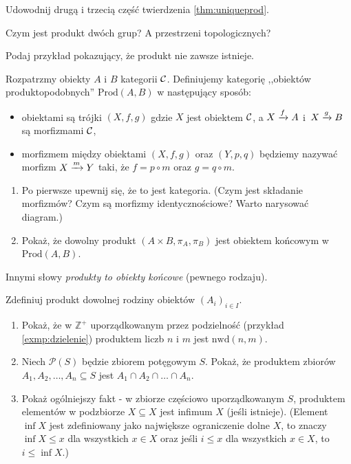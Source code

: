 \begin{exc}
  Udowodnij drugą i trzecią część twierdzenia \ref{thm:uniqueprod}.
\end{exc}

\begin{exc}
  Czym jest produkt dwóch grup? A przestrzeni topologicznych?
\end{exc}

\begin{exc}
  Podaj przykład pokazujący, że produkt nie zawsze istnieje.
\end{exc}

\begin{exc}
  \label{exc:produkt_poczatkowy}
  {
  \newcommand{\Prod}{\text{Prod}(A, B)}
  Rozpatrzmy obiekty $A$ i $B$ kategorii $\C$. Definiujemy kategorię ,,obiektów produktopodobnych'' $\Prod$ w następujący sposób:
  \begin{itemize}
    \item obiektami są trójki $(X, f, g)$ gdzie $X$ jest obiektem $\C$, a $\morpharr fXA$ i~$\morpharr gXB$ są morfizmami $\C$,
    \item morfizmem między obiektami $(X, f, g)$ oraz $(Y, p, q)$ będziemy nazywać morfizm $\morpharr mXY$ taki, że $f=p\circ m$ oraz $g=q\circ m$.
  \end{itemize}

  \begin{enumerate}
    \item Po pierwsze upewnij się, że to jest kategoria. (Czym jest składanie morfizmów? Czym są morfizmy identycznościowe? Warto narysować diagram.)
    \item Pokaż, że dowolny produkt $(A\times B, \pi_A, \pi_B)$ jest obiektem końcowym w $\Prod$.
  \end{enumerate}
  Innymi słowy \emph{produkty to obiekty końcowe} (pewnego rodzaju).
  }
\end{exc}

\begin{exc}
  Zdefiniuj produkt dowolnej rodziny obiektów $(A_i)_{i\in I}$.
\end{exc}

\begin{exc}
  \begin{enumerate}
    \item Pokaż, że w $\mathbb Z^+$ uporządkowanym przez podzielność (przykład \ref{exmp:dzielenie}) produktem liczb $n$ i $m$ jest $\mathrm{nwd}(n, m)$.
    \item Niech $\mathcal P(S)$ będzie zbiorem potęgowym $S$. Pokaż, że produktem zbiorów $A_1, A_2, \dots, A_n\subseteq S$ jest $A_1\cap A_2\cap \dots \cap A_n$.
    \item Pokaż ogólniejszy fakt - w zbiorze częściowo uporządkowanym $S$, produktem elementów w podzbiorze $X\subseteq X$ jest infimum $X$ (jeśli istnieje). (Element $\inf X$ jest zdefiniowany jako największe ograniczenie dolne $X$, to znaczy $\inf X\le x$ dla wszystkich $x\in X$ oraz jeśli $i\le x$ dla wszystkich $x\in X$, to $i\le \inf X$.)
  \end{enumerate}
\end{exc}

